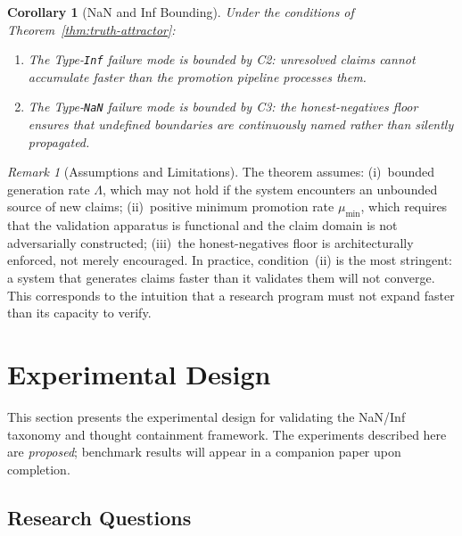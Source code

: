 \documentclass[11pt]{article}
\newtheorem{corollary}[theorem]{Corollary}
\theoremstyle{definition}
\theoremstyle{remark}
\newtheorem{remark}[theorem]{Remark}
\newcommand{\NaN}{\texttt{NaN}}
\newcommand{\Inf}{\texttt{Inf}}
\begin{document}
\begin{corollary}[NaN and Inf Bounding]
\label{cor:nan-inf-bounding}
Under the conditions of Theorem~\ref{thm:truth-attractor}:
\begin{enumerate}
  \item The Type-\Inf{} failure mode is bounded by C2: unresolved claims
    cannot accumulate faster than the promotion pipeline processes them.
  \item The Type-\NaN{} failure mode is bounded by C3: the honest-negatives
    floor ensures that undefined boundaries are continuously named rather
    than silently propagated.
\end{enumerate}
\end{corollary}

\begin{remark}[Assumptions and Limitations]
\label{rem:attractor-limitations}
The theorem assumes: (i)~bounded generation rate $\Lambda$, which may not
hold if the system encounters an unbounded source of new claims; (ii)~positive
minimum promotion rate $\mu_{\min}$, which requires that the validation
apparatus is functional and the claim domain is not adversarially constructed;
(iii)~the honest-negatives floor is architecturally enforced, not merely
encouraged.  In practice, condition~(ii) is the most stringent: a system
that generates claims faster than it validates them will not converge.
This corresponds to the intuition that a research program must not expand
faster than its capacity to verify.
\end{remark}

\section{Experimental Design}
\label{sec:experiments}

This section presents the experimental design for validating the NaN/Inf
taxonomy and thought containment framework.  The experiments described here
are \emph{proposed}; benchmark results will appear in a companion paper
upon completion.

\subsection{Research Questions}
\label{sec:research-questions}
\end{document}
